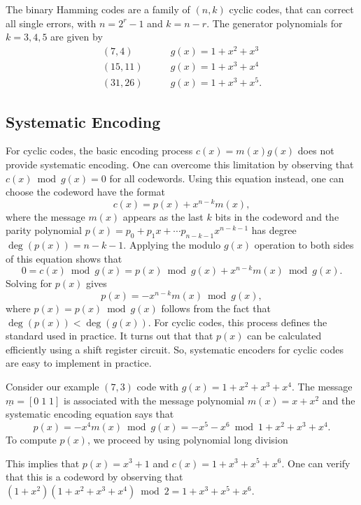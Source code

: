 \begin{example}
The binary Hamming codes are a family of $(n,k)$ cyclic codes, that can correct all single errors, with $n=2^r - 1$ and $k=n-r$.
The generator polynomials for $k=3,4,5$ are given by
\begin{align*}
(7,4) & \quad \quad g(x) = 1+x^2+x^3 \\
(15,11) & \quad \quad g(x) = 1+x^3+x^4 \\
(31,26) & \quad \quad g(x) = 1+x^3+x^5.
\end{align*}
\end{example}

\subsection{Systematic Encoding}

For cyclic codes, the basic encoding process $c(x)=m(x)g(x)$ does not provide systematic encoding.
One can overcome this limitation by observing that $c(x) \bmod g(x) = 0$ for all codewords.
Using this equation instead, one can choose the codeword have the format
\[ c(x) = p(x) + x^{n-k} m(x), \]
where the message $m(x)$ appears as the last $k$ bits in the codeword and the parity polynomial $p(x)=p_0 + p_1 x + \cdots p_{n-k-1} x^{n-k-1}$ has degree $\deg\left( p(x)\right) = n-k-1$.
Applying the modulo $g(x)$ operation to both sides of this equation shows that
\[ 0 = c(x) \bmod g(x) = p(x) \bmod g(x) + x^{n-k} m(x) \bmod g(x). \]
Solving for $p(x)$ gives
\[ p(x) = - x^{n-k} m(x) \bmod g(x), \]
where $p(x) = p(x) \bmod g(x)$ follows from the fact that $\deg\left( p(x)\right) < \deg\left( g(x)\right)$.
For cyclic codes, this process defines the standard  used in practice.
It turns out that that  $p(x)$ can be calculated efficiently using a shift register circuit.
So, systematic encoders for cyclic codes are easy to implement in practice.

\begin{example}
Consider our example $(7,3)$ code with $g(x) = 1 + x^2 + x^3 + x^4$.
The message $\underline{m} = [0\;1\;1]$ is associated with the message polynomial $m(x) = x+x^2$ and the systematic encoding equation says that
\[ p(x) = - x^4 m(x) \bmod g(x) = -x^5 - x^6 \bmod 1+x^2 + x^3 + x^4. \]
To compute $p(x)$, we proceed by using polynomial long division
\begin{center}
\end{center}
This implies that $p(x) = x^3+1$ and $c(x) = 1+x^3 + x^5 + x^6$.
One can verify that this is a codeword by observing that $(1+x^2)(1+x^2+x^3+x^4)\bmod 2 = 1+x^3+x^5+x^6$.
\end{example}

